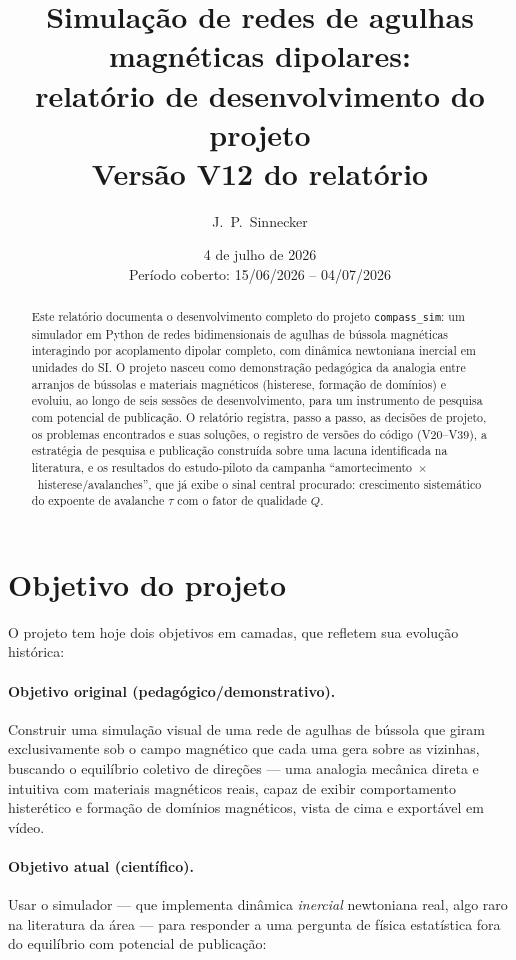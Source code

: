 \documentclass[11pt,a4paper]{article}
\title{\textbf{Simulação de redes de agulhas magnéticas dipolares:\\
relatório de desenvolvimento do projeto \code{compass\_sim}}\\[1ex]
\large Versão V12 do relatório}
\author{J.~P.~Sinnecker}
\date{4 de julho de 2026\\[0.5ex]
\small Período coberto: 15/06/2026 -- 04/07/2026}
\newcommand{\code}[1]{\texttt{#1}}
\begin{document}
\maketitle

\begin{abstract}
\noindent
Este relatório documenta o desenvolvimento completo do projeto
\code{compass\_sim}: um simulador em Python de redes bidimensionais de
agulhas de bússola magnéticas interagindo por acoplamento dipolar
completo, com dinâmica newtoniana inercial em unidades do SI. O projeto
nasceu como demonstração pedagógica da analogia entre arranjos de
bússolas e materiais magnéticos (histerese, formação de domínios) e
evoluiu, ao longo de seis sessões de desenvolvimento, para um
instrumento de pesquisa com potencial de publicação. O relatório
registra, passo a passo, as decisões de projeto, os problemas
encontrados e suas soluções, o registro de versões do código
(V20--V39), a estratégia de pesquisa e publicação construída sobre uma
lacuna identificada na literatura, e os resultados do estudo-piloto da
campanha ``amortecimento~$\times$~histerese/avalanches'', que já exibe o
sinal central procurado: crescimento sistemático do expoente de
avalanche $\tau$ com o fator de qualidade $Q$.
\end{abstract}

\tableofcontents
\newpage

\section{Objetivo do projeto}

O projeto tem hoje dois objetivos em camadas, que refletem sua evolução
histórica:

\paragraph{Objetivo original (pedagógico/demonstrativo).}
Construir uma simulação visual de uma rede de agulhas de bússola que
giram exclusivamente sob o campo magnético que cada uma gera sobre as
vizinhas, buscando o equilíbrio coletivo de direções --- uma analogia
mecânica direta e intuitiva com materiais magnéticos reais, capaz de
exibir comportamento histerético e formação de domínios magnéticos,
vista de cima e exportável em vídeo.

\paragraph{Objetivo atual (científico).}
Usar o simulador --- que implementa dinâmica \emph{inercial} newtoniana
real, algo raro na literatura da área --- para responder a uma pergunta
de física estatística fora do equilíbrio com potencial de publicação:
\end{document}
